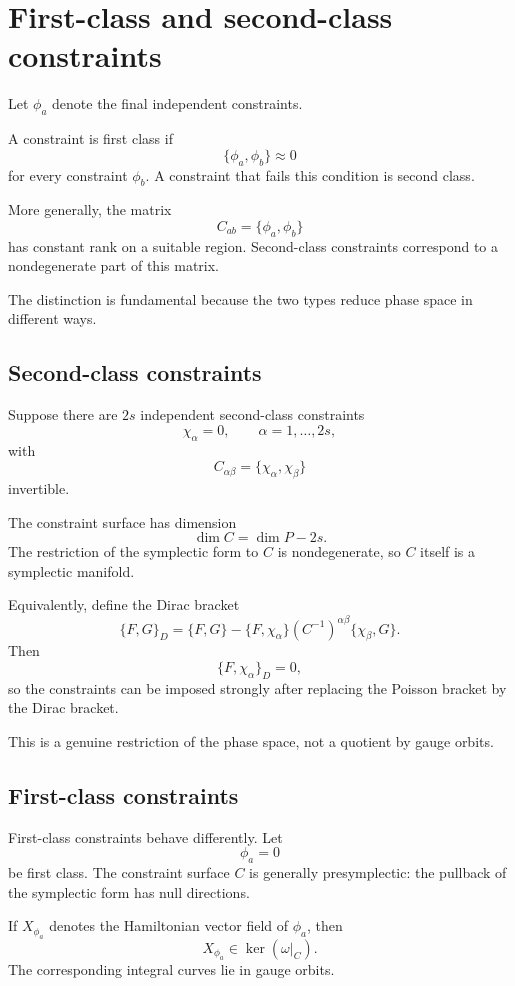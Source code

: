 \documentclass[11pt,a4paper]{article}
\newcommand{\approxd}{\mathrel{\approx}}
\theoremstyle{definition}
\begin{document}
\section{First-class and second-class constraints}

Let $\phi_a$ denote the final independent constraints.

A constraint is first class if
\[
        \{\phi_a,\phi_b\}\approxd0
\]
for every constraint $\phi_b$.  A constraint that fails this condition is
second class.

More generally, the matrix
\[
        C_{ab}=\{\phi_a,\phi_b\}
\]
has constant rank on a suitable region.  Second-class constraints correspond
to a nondegenerate part of this matrix.

The distinction is fundamental because the two types reduce phase space in
different ways.

\subsection{Second-class constraints}

Suppose there are $2s$ independent second-class constraints
\[
        \chi_\alpha=0,
        \qquad
        \alpha=1,\ldots,2s,
\]
with
\[
        C_{\alpha\beta}
        =
        \{\chi_\alpha,\chi_\beta\}
\]
invertible.

The constraint surface has dimension
\[
        \dim C=\dim P-2s.
\]
The restriction of the symplectic form to $C$ is nondegenerate, so $C$ itself
is a symplectic manifold.

Equivalently, define the Dirac bracket
\[
\{F,G\}_D
=
\{F,G\}
-
\{F,\chi_\alpha\}
(C^{-1})^{\alpha\beta}
\{\chi_\beta,G\}.
\]
Then
\[
        \{F,\chi_\alpha\}_D=0,
\]
so the constraints can be imposed strongly after replacing the Poisson
bracket by the Dirac bracket.

This is a genuine restriction of the phase space, not a quotient by gauge
orbits.

\subsection{First-class constraints}

First-class constraints behave differently.  Let
\[
        \phi_a=0
\]
be first class.  The constraint surface $C$ is generally presymplectic:
the pullback of the symplectic form has null directions.

If $X_{\phi_a}$ denotes the Hamiltonian vector field of $\phi_a$, then
\[
        X_{\phi_a}\in\ker(\omega|_C).
\]
The corresponding integral curves lie in gauge orbits.
\end{document}
